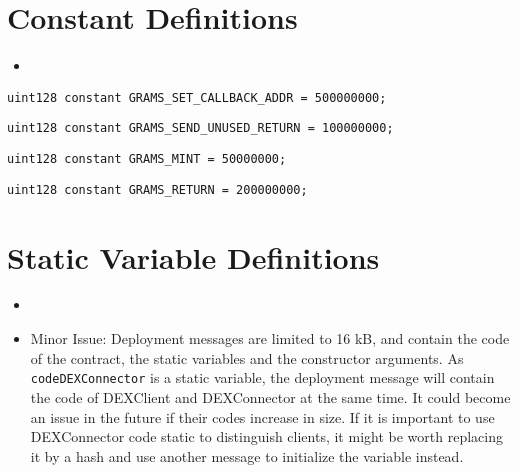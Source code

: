 \section{Constant Definitions}

\begin{itemize}
  \item \issueUnits{}
\end{itemize}

\begin{lstlisting}[firstnumber=65]
  uint128 constant GRAMS_SET_CALLBACK_ADDR = 500000000;
\end{lstlisting}

\begin{lstlisting}[firstnumber=66]
  uint128 constant GRAMS_SEND_UNUSED_RETURN = 100000000;
\end{lstlisting}

\begin{lstlisting}[firstnumber=67]
  uint128 constant GRAMS_MINT = 50000000;
\end{lstlisting}

\begin{lstlisting}[firstnumber=68]
  uint128 constant GRAMS_RETURN = 200000000;
\end{lstlisting}

\section{Static Variable Definitions}

\begin{itemize}
\item \issueStatic{}
\item Minor Issue: Deployment messages are limited to 16 kB, and
  contain the code of the contract, the static variables and the
  constructor arguments. As {\tt codeDEXConnector} is a static
  variable, the deployment message will contain the code of DEXClient
  and DEXConnector at the same time. It could become an issue in the
  future if their codes increase in size. If it is important to use
  DEXConnector code static to distinguish clients, it might be worth
  replacing it by a hash and use another message to initialize the
  variable instead.
\end{itemize}

